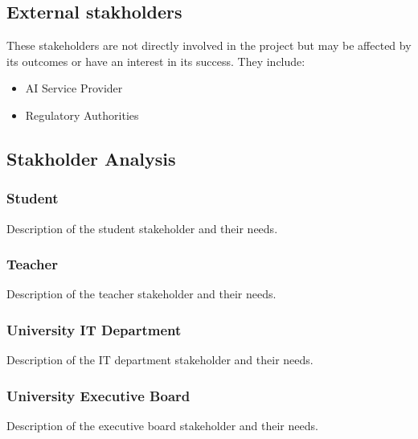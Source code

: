 \documentclass[12pt,a4paper]{article}
\begin{document}
\subsection{External stakholders}
These stakeholders are not directly involved in the project but may be affected by its outcomes or have an interest in its success. They include:
\begin{itemize}
    \item AI Service Provider
    \item Regulatory Authorities
\end{itemize}

\subsection{Stakholder Analysis}

\subsubsection{Student}
Description of the student stakeholder and their needs.
\subsubsection{Teacher}
Description of the teacher stakeholder and their needs.
\subsubsection{University IT Department}
Description of the IT department stakeholder and their needs.
\subsubsection{University Executive Board}
Description of the executive board stakeholder and their needs.
\end{document}
